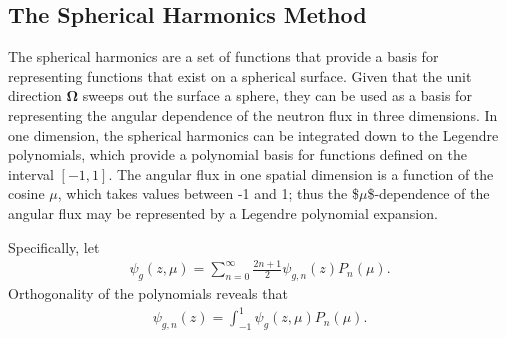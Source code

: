 \documentclass[11pt]{article}
\renewcommand\vec{\mathbf}
\begin{document}
\subsection{The Spherical Harmonics Method}
\label{sec:orgheadline12}
The spherical harmonics are a set of functions that provide a basis for representing functions that exist on a spherical surface.  Given that the unit direction \(\vec{\Omega}\) sweeps out the surface a sphere, they can be used as a basis for representing the angular dependence of the neutron flux in three dimensions.  In one dimension, the spherical harmonics can be integrated down to the Legendre polynomials, which provide a polynomial basis for functions defined on the interval \([-1,1]\).  The angular flux in one spatial dimension is a function of the cosine \(\mu\), which takes values between -1 and 1; thus the \$\(\mu\)\$-dependence of the angular flux may be represented by a Legendre polynomial expansion.

Specifically, let
\begin{align}
  \psi_g(z,\mu) = \sum_{n=0}^\infty \frac{2n+1}{2} \psi_{g,n}(z) P_n(\mu).
\end{align}
Orthogonality of the polynomials reveals that
\begin{align}
  \psi_{g,n}(z) = \int_{-1}^1 \psi_g(z,\mu) P_n(\mu).
\end{align}
\end{document}
